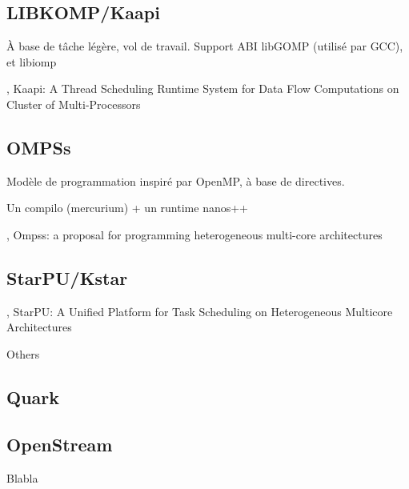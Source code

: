 \subsection{LIBKOMP/Kaapi}

À base de tâche légère, vol de travail.
Support ABI libGOMP (utilisé par GCC), et libiomp

\cite{Gautier2007}, Kaapi: A Thread Scheduling Runtime System for Data Flow Computations on Cluster of Multi-Processors


\subsection{OMPSs}

Modèle de programmation inspiré par OpenMP, à base de directives.

Un compilo (mercurium) + un runtime nanos++

\cite{OMPSs}, Ompss: a proposal for programming heterogeneous multi-core architectures

\subsection{StarPU/Kstar}

\cite{StarPU}, StarPU: A Unified Platform for Task Scheduling on Heterogeneous Multicore Architectures


Others

\subsection{Quark}
\subsection{OpenStream}

Blabla
